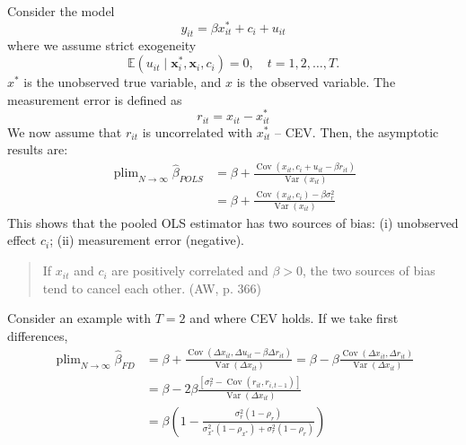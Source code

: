 \documentclass[11pt, a4paper]{report}
\theoremstyle{plain}
\theoremstyle{plain}
\theoremstyle{remark}
\begin{document}
Consider the model
\begin{equation}
    y_{i t}=\beta x_{i t}^{*}+c_{i}+u_{i t}
\end{equation}
where we assume strict exogeneity
\begin{equation}
    \mathbb{E}\left(u_{i t} \mid \mathbf{x}_{i}^{*}, \mathbf{x}_{i}, c_{i}\right)=0, \quad t=1,2, \ldots, T.
\end{equation}
$x^*$ is the unobserved true variable, and $x$ is the observed variable. 
The measurement error is defined as
\begin{equation}
    r_{it} = x_{it} - x_{it}^*
\end{equation}
We now assume that $r_{it}$ is uncorrelated with $x_{it}^*$ -- CEV. Then, the asymptotic results are: 
\begin{equation}
    \begin{aligned}
    \operatorname{plim}_{N \rightarrow \infty} \hat{\beta}_{P O L S} &=\beta+\frac{\operatorname{Cov}\left(x_{i t}, c_{i}+u_{i t}-\beta r_{i t}\right)}{\operatorname{Var}\left(x_{i t}\right)} \\
    &=\beta+\frac{\operatorname{Cov}\left(x_{i t}, c_{i}\right)-\beta \sigma_{r}^{2}}{\operatorname{Var}\left(x_{i t}\right)}
    \end{aligned}
    \end{equation}
This shows that the pooled OLS estimator has two sources of bias: (i) unobserved effect $c_i$; (ii) measurement error (negative).
\begin{quote}
    If $x_{it}$ and $c_i$ are positively correlated and $\beta > 0$, the two sources of bias tend to cancel each other. (AW, p. 366)
\end{quote}

Consider an example with $T = 2$ and where CEV holds. If we take first differences,
\begin{equation}
    \begin{aligned}
    \operatorname{plim}_{N \rightarrow \infty} \hat{\beta}_{F D} &=\beta+\frac{\operatorname{Cov}\left(\Delta x_{i t}, \Delta u_{i t}-\beta \Delta r_{i t}\right)}{\operatorname{Var}\left(\Delta x_{i t}\right)}=\beta-\beta \frac{\operatorname{Cov}\left(\Delta x_{i t}, \Delta r_{i t}\right)}{\operatorname{Var}\left(\Delta x_{i t}\right)} \\
    &=\beta-2 \beta \frac{\left[\sigma_{r}^{2}-\operatorname{Cov}\left(r_{i t}, r_{i, t-1}\right)\right]}{\operatorname{Var}\left(\Delta x_{i t}\right)} \\
    &=\beta\left(1-\frac{\sigma_{r}^{2}\left(1-\rho_{r}\right)}{\sigma_{x^{*}}^{2}\left(1-\rho_{x^{*}}\right)+\sigma_{r}^{2}\left(1-\rho_{r}\right)}\right)
    \end{aligned}
\end{equation}
\end{document}
